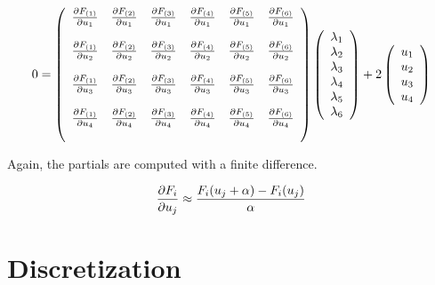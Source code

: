 \begin{equation}
    0  = \left(
    \begin{array}{c c c c c c}
    \frac{\partial F_{(1)}}{\partial u_1} & \frac{\partial F_{(2)}}{\partial u_1} & \frac{\partial F_{(3)}}{\partial u_1} & \frac{\partial F_{(4)}}{\partial u_1} & \frac{\partial F_{(5)}}{\partial u_1} & \frac{\partial F_{(6)}}{\partial u_1} \\\\
    \frac{\partial F_{(1)}}{\partial u_2} & \frac{\partial F_{(2)}}{\partial u_2} & \frac{\partial F_{(3)}}{\partial u_2} & \frac{\partial F_{(4)}}{\partial u_2} & \frac{\partial F_{(5)}}{\partial u_2} & \frac{\partial F_{(6)}}{\partial u_2} \\\\
    \frac{\partial F_{(1)}}{\partial u_3} & \frac{\partial F_{(2)}}{\partial u_3} & \frac{\partial F_{(3)}}{\partial u_3} & \frac{\partial F_{(4)}}{\partial u_3} & \frac{\partial F_{(5)}}{\partial u_3} & \frac{\partial F_{(6)}}{\partial u_3} \\\\
    \frac{\partial F_{(1)}}{\partial u_4} & \frac{\partial F_{(2)}}{\partial u_4} & \frac{\partial F_{(3)}}{\partial u_4} & \frac{\partial F_{(4)}}{\partial u_4} & \frac{\partial F_{(5)}}{\partial u_4} & \frac{\partial F_{(6)}}{\partial u_4} \\\\
    \end{array}\right)
    \left(
    \begin{array}{c}
    \lambda_1\\
    \lambda_2\\
    \lambda_3\\
    \lambda_4\\
    \lambda_5\\
    \lambda_6\\
    \end{array}\right) + 2
    \left(\begin{array}{c} u_1 \\ u_2 \\ u_3 \\ u_4\end{array}\right)
\end{equation}

Again, the partials are computed with a finite difference.

\begin{equation}
    \frac{\partial F_i}{\partial u_j} \approx \frac{ F_i( u_j + \alpha) - F_i( u_j)  }{\alpha}
\end{equation}



\section{Discretization}

